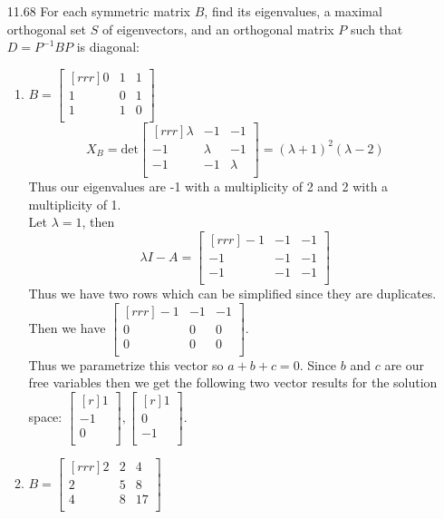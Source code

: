\documentclass[12pt]{article}
\theoremstyle{definition}
\theoremstyle{plain}
\begin{document}
\begin{enumerate}
	
\item[11.68]For each symmetric matrix $B$, find its eigenvalues, a maximal orthogonal set $S$ of eigenvectors, and an orthogonal matrix $P$ such that $D=P^{-1}BP$ is diagonal:
	\begin{enumerate}
	\item $B=\begin{bmatrix}[rrr]0&1&1\\1&0&1\\1&1&0\\\end{bmatrix}$\\
	\[ X_B=\mathrm{det}\begin{bmatrix}[rrr]\lambda&-1&-1\\-1&\lambda&-1\\-1&-1&\lambda\\\end{bmatrix} = (\lambda+1)^2(\lambda-2) \]
	Thus our eigenvalues are -1 with a multiplicity of 2 and 2 with a multiplicity of 1.\\
	Let $\lambda=1$, then
	\[ \lambda I - A = \begin{bmatrix}[rrr]-1&-1&-1\\-1&-1&-1\\-1&-1&-1\\\end{bmatrix} \]
	Thus we have two rows which can be simplified since they are duplicates. Then we have $\begin{bmatrix}[rrr]-1&-1&-1\\0&0&0\\0&0&0\\\end{bmatrix}$.\\
	Thus we parametrize this vector so $a+b+c=0$. Since $b$ and $c$ are our free variables then we get the following two vector results for the solution space: $\begin{bmatrix}[r]1\\-1\\0\\\end{bmatrix},\begin{bmatrix}[r]1\\0\\-1\\\end{bmatrix}$.
	\item $B=\begin{bmatrix}[rrr]2&2&4\\2&5&8\\4&8&17\\\end{bmatrix}$

\end{enumerate}
\end{enumerate}
\end{document}
